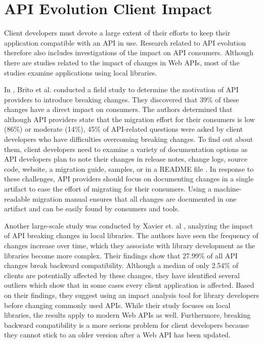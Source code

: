 \section{API Evolution Client Impact}
\label{sec:APIEvolutionClientImpact}

Client developers must devote a large extent of their efforts to keep their application compatible with an API in use. Research related to API evolution therefore also includes investigations of the impact on API consumers. Although there are studies related to the impact of changes in Web APIs, most of the studies examine applications using local libraries.

In \cite{brito_you_2020}, Brito et al. conducted a field study to determine the motivation of API providers to introduce breaking changes. They discovered that 39\% of these changes have a direct impact on consumers. The authors determined that although API providers state that the migration effort for their consumers is low (86\%) or moderate (14\%), 45\% of API-related questions were asked by client developers who have difficulties overcoming breaking changes. To find out about them, client developers need to examine a variety of documentation options as API developers plan to note their changes in release notes, change logs, source code, website, a migration guide, samples, or in a README file \cite{brito_you_2020}. In response to these challenges, API providers should focus on documenting changes in a single artifact to ease the effort of migrating for their consumers. Using a machine-readable migration manual ensures that all changes are documented in one artifact and can be easily found by consumers and tools.

Another large-scale study was conducted by Xavier et. al \cite{xavier_historical_2017}, analyzing the impact of API breaking changes in local libraries. The authors have seen the frequency of changes increase over time, which they associate with library development as the libraries become more complex. Their findings show that 27.99\% of all API changes break backward compatibility. Although a median of only 2.54\% of clients are potentially affected by these changes, they have identified several outliers which show that in some cases every client application is affected. Based on their findings, they suggest using an impact analysis tool for library developers before changing commonly used APIs. While their study focuses on local libraries, the results apply to modern Web APIs as well. Furthermore, breaking backward compatibility is a more serious problem for client developers because they cannot stick to an older version after a Web API has been updated.

